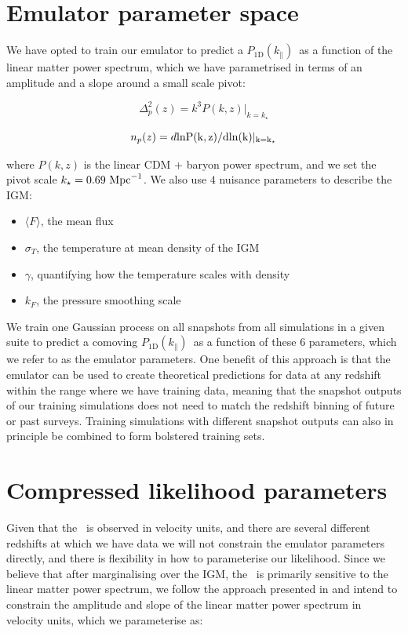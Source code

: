 \documentclass[preprintnumbers,prd,superscriptaddress,notitlepage,nofootinbib] {revtex4-1}
\newcommand{\fluxpower}{$P_\mathrm{1D}(k_\parallel)$}
\begin{document}
\section{Emulator parameter space}
We have opted to train our emulator to predict a \fluxpower\ as
a function of the linear matter power spectrum, which we have parametrised in
terms of an amplitude and a slope around a small scale pivot:

\begin{equation}
    \label{eq:Delta2_p}
    \Delta^2_p(z)=k^3P(k, z)|_{k=k_\star}
\end{equation}

\begin{equation}
    \label{eq:n_p}
    n_p(z)=d\rm{ln}P(k,z) / d \rm{ln}(k)|_{k=k_\star}
\end{equation}

where $P(k,z)$ is the linear CDM + baryon power spectrum, and we set the pivot
scale $k_\star=0.69 \ \text{Mpc}^{-1}$. We also use $4$ nuisance parameters
to describe the IGM:

\begin{itemize}
    \item $\langle F \rangle$, the mean flux
    \item $\sigma_T$, the temperature at mean density of the IGM
    \item $\gamma$, quantifying how the temperature scales with density
    \item $k_F$, the pressure smoothing scale
\end{itemize}

We train one Gaussian
process on all snapshots from all simulations in a given suite to predict a
comoving \fluxpower\ as a function of these $6$ parameters, which we refer to as the
emulator parameters. One benefit of this approach is that the emulator can be used
to create theoretical predictions for data at any redshift within the range where
we have training data, meaning that the snapshot outputs of our training simulations
does not need to match the redshift binning of future or past surveys.
Training simulations with different snapshot outputs can also in principle be combined
to form bolstered training sets.

\section{Compressed likelihood parameters}
Given that the \lyaf\ is observed in velocity units, and there are several different
redshifts at which we have data we will not constrain the emulator parameters directly,
and there is flexibility in how to parameterise our likelihood. Since we believe that
after marginalising over the IGM, the \lyaf\ is primarily sensitive to the linear
matter power spectrum, we follow the approach presented in \cite{McDonald2005a}
and intend to constrain the amplitude and slope of the linear matter power spectrum
in velocity units, which we parameterise as:
\end{document}
